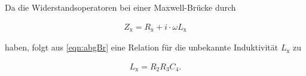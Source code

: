 Da die Widerstandsoperatoren bei einer Maxwell-Brücke durch

\begin{align*}
    Z_{\text{x}} = R_{\text{x}} + i\cdot \omega L_{\text{x}}
\end{align*}

haben, folgt aus \autoref{eqn:abgBr} eine Relation für die unbekannte Induktivität $L_{\text{x}}$ zu

\begin{align}
    L_{\text{x}} = R_2R_3C_4.
\end{align}